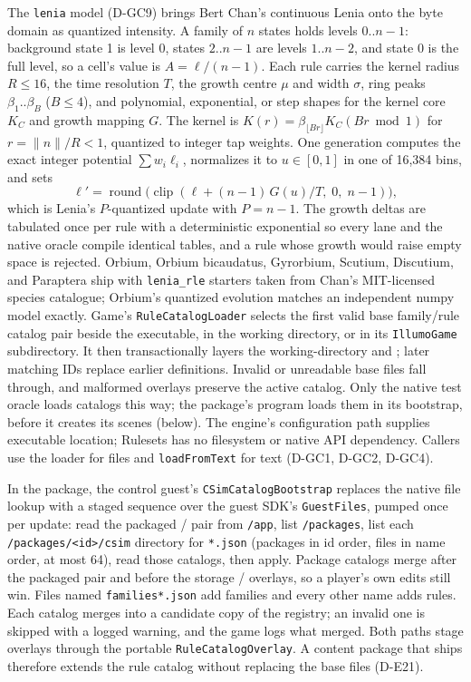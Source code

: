 The \texttt{lenia} model (D-GC9) brings Bert Chan's continuous Lenia onto the
byte domain as quantized intensity. A family of $n$ states holds levels
$0..n-1$: background state 1 is level 0, states $2..n-1$ are levels
$1..n-2$, and state 0 is the full level, so a cell's value is
$A = \ell/(n-1)$. Each rule carries the kernel radius $R \le 16$, the time
resolution $T$, the growth centre $\mu$ and width $\sigma$, ring peaks
$\beta_1..\beta_B$ ($B \le 4$), and polynomial, exponential, or step shapes for
the kernel core $K_C$ and growth mapping $G$. The kernel is
$K(r) = \beta_{\lfloor Br \rfloor} K_C(Br \bmod 1)$ for $r = \lVert n \rVert/R < 1$,
quantized to integer tap weights. One generation computes the exact integer
potential $\sum w_i \ell_i$, normalizes it to $u \in [0,1]$ in one of 16,384
bins, and sets
\[
\ell' = \operatorname{round}\bigl(\operatorname{clip}(\ell + (n-1)\,G(u)/T,\;0,\;n-1)\bigr),
\]
which is Lenia's $P$-quantized update with $P = n-1$. The growth deltas are
tabulated once per rule with a deterministic exponential so every lane and
the native oracle compile identical tables, and a rule whose growth would raise
empty space is rejected. Orbium, Orbium bicaudatus, Gyrorbium, Scutium,
Discutium, and Paraptera ship with \texttt{lenia\_rle} starters taken from
Chan's MIT-licensed species catalogue; Orbium's quantized evolution matches an
independent numpy model exactly.
Game's \texttt{RuleCatalogLoader} selects the first valid base family/rule
catalog pair beside the executable, in the working directory, or in its
\texttt{IllumoGame} subdirectory. It then transactionally layers the
working-directory  and
; later matching IDs replace earlier definitions.
Invalid or unreadable base files fall through, and malformed overlays preserve
the active catalog. Only the native test oracle loads catalogs this way; the
package's program loads them in its bootstrap, before it creates its scenes
(below). The engine's configuration path supplies
executable location; Rulesets has no filesystem or native API dependency.
Callers use the loader for files and \texttt{loadFromText} for text (D-GC1,
D-GC2, D-GC4).

In the package, the control guest's \texttt{CSimCatalogBootstrap} replaces
the native file lookup with a staged sequence over the guest SDK's
\texttt{GuestFiles}, pumped once per update: read the packaged
/ pair from \texttt{/app}, list
\texttt{/packages}, list each \texttt{/packages/<id>/csim} directory for
\texttt{*.json} (packages in id order, files in name order, at most 64), read
those catalogs, then apply. Package catalogs merge after the packaged pair and
before the storage /
overlays, so a player's own edits still win. Files named
\texttt{families*.json} add families and every other name adds rules. Each
catalog merges into a candidate copy of the registry; an invalid one is skipped
with a logged warning, and the game logs what merged. Both paths stage
overlays through the portable \texttt{RuleCatalogOverlay}. A content package
that ships  therefore extends the rule catalog without
replacing the base files (D-E21).

